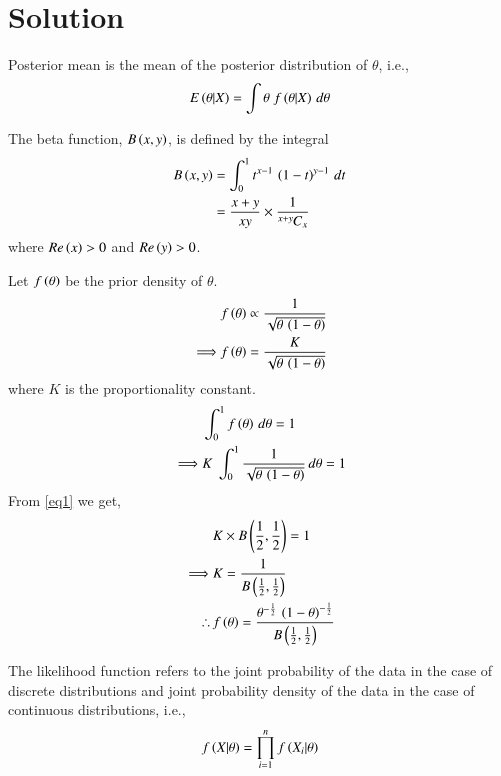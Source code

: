 \documentclass[journal,12pt,twocolumn]{IEEEtran}
\begin{document}
\section*{Solution}
\begin{definition}
Posterior mean is the mean of the posterior distribution of $\theta$, i.e., 
\begin{align}
    E\left(\theta|X\right) = \int{\theta\;f\ensuremath{\left(\theta|X\right)}\,d\theta}\label{eq5}
\end{align}

\end{definition}
\begin{definition}
The beta function, $B\left(x,y\right)$, is defined by the integral
\begin{align}
    B\left(x,y\right) &= \int_0^1 t^{x-1}\,\left(1-t\right)^{y-1}\,dt\nonumber\\
    &= \frac{x+y}{xy}\times \frac{1}{{{}^{x+y}\mkern-1muC_{x}}}\label{eq1}
\end{align}
where $Re\left(x\right)>0$ and $Re\left(y\right)>0$.
\end{definition}
Let $f\left(\theta\right)$ be the prior density of $\theta$.
\begin{align}
    &f\left(\theta\right) \propto \frac{1}{\sqrt{\theta\,\left(1-\theta\right)}}\nonumber\\
    \implies &f\left(\theta\right) = \frac{K}{\sqrt{\theta\,\left(1-\theta\right)}}
\end{align}
where $K$ is the proportionality constant.
\begin{align}
    &\int_0^1 f\left(\theta\right)\,d\theta = 1\nonumber\\
    \implies &K\;\int_0^1 \frac{1}{\sqrt{\theta\,\left(1-\theta\right)}}\,d\theta =1
\end{align}
From \eqref{eq1} we get,
\begin{align}
    &K\times B\left(\frac{1}{2},\frac{1}{2}\right) = 1\nonumber\\
    \implies &K = \frac{1}{B\left(\frac{1}{2},\frac{1}{2}\right)}\\
    \therefore\, &f\left(\theta\right) = \frac{\theta^{-\frac{1}{2}}\,\left(1-\theta\right)^{-\frac{1}{2}}}{B\left(\frac{1}{2},\frac{1}{2}\right)}\label{eq6}
\end{align}
\begin{definition}
The likelihood function refers to the joint probability of the data in the case of discrete distributions and joint probability density of the data in the case of continuous distributions, i.e., 
\begin{align}
    f\left(X|\theta\right) = \prod_{i=1}^n f\left(X_i|\theta\right)\label{eq8}
\end{align}
\end{definition}
\end{document}
